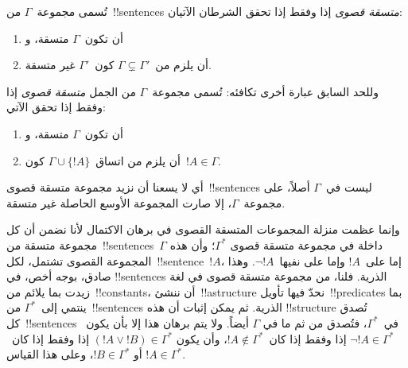 \documentclass[../../../include/open-logic-section]{subfiles}
\begin{document}

\begin{defn}
تُسمى مجموعة~$\Gamma$ من~!!{sentence}s
\emph{متسقة قصوى} إذا وفقط إذا تحقق الشرطان الآتيان:
\begin{enumerate}
\item أن تكون~$\Gamma$ متسقة، و
\item أن يلزم من~$\Gamma \subsetneq \Gamma'$ كون~$\Gamma'$ غير متسقة.
\end{enumerate}
\end{defn}

\begin{explain}
وللحد السابق عبارة أخرى تكافئه: تُسمى مجموعة~$\Gamma$ من الجمل
\emph{متسقة قصوى} إذا وفقط إذا تحقق الآتي:
\begin{enumerate}
\item أن تكون~$\Gamma$ متسقة، و
\item أن يلزم من اتساق~$\Gamma \cup \{ !A \}$ كون~$!A \in \Gamma$.
\end{enumerate}
أي لا يسعنا أن نزيد مجموعة متسقة قصوى~!!{sentence}s ليست في~$\Gamma$
أصلاً، على مجموعة~$\Gamma$، إلا صارت المجموعة الأوسع الحاصلة غير متسقة.
\end{explain}

\begin{explain}
وإنما عظمت منزلة المجموعات المتسقة القصوى في برهان الاكتمال لأنا نضمن أن
كل مجموعة متسقة من~!!{sentence}s~$\Gamma$ داخلة في مجموعة متسقة قصوى
$\Gamma^*$؛ وأن هذه المجموعة القصوى تشتمل، لكل~!!{sentence}~$!A$، إما
على~$!A$ وإما على نفيها~$\lnot !A$. وهذا صادق، بوجه أخص، في
!!{sentence}s الذرية. فلنا، من مجموعة متسقة قصوى في لغة زيدت بما يلائم
من~!!{constant}s، أن ننشئ~!!a{structure} نحدّ فيها تأويل~!!{predicate}s
بما ينتمي إلى~$\Gamma^*$ من~!!{sentence}s الذرية. ثم يمكن إثبات أن هذه
!!{structure} تُصدق كل~!!{sentence}s في~$\Gamma^*$، فتُصدق من ثم ما في
$\Gamma$ أيضاً. ولا يتم برهان هذا إلا بأن يكون~$\lnot !A \in \Gamma^*$
إذا وفقط إذا كان~$!A \notin \Gamma^*$، وأن يكون
$(!A \lor !B) \in \Gamma^*$ إذا وفقط إذا كان~$!A \in \Gamma^*$ أو
$!B \in \Gamma^*$، وعلى هذا القياس.
\end{explain}
\end{document}
